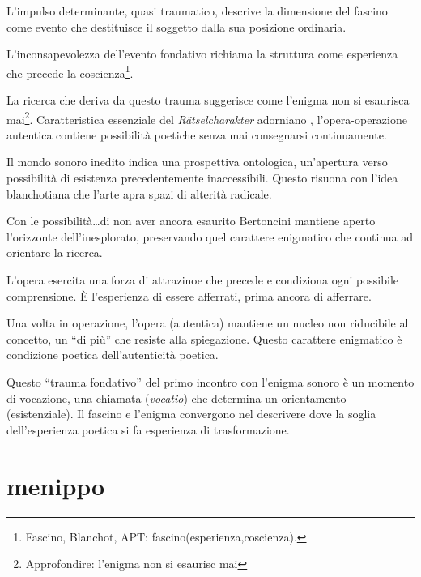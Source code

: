 L'impulso determinante, quasi traumatico, descrive la dimensione del fascino
come evento che destituisce il soggetto dalla sua posizione ordinaria.

L'inconsapevolezza dell'evento fondativo richiama la struttura come esperienza
che precede la coscienza\footnote{Fascino, Blanchot, APT: fascino(esperienza,coscienza).}.

La ricerca che deriva da questo trauma suggerisce come l'enigma non si esaurisca
mai\footnote{Approfondire: l'enigma non si esaurisc mai}. Caratteristica
essenziale del \emph{Rätselcharakter} adorniano \cite{adorno}, l'opera-operazione
autentica contiene possibilità poetiche senza mai consegnarsi continuamente.

Il mondo sonoro  inedito indica una prospettiva ontologica, un'apertura verso
possibilità di esistenza precedentemente inaccessibili. Questo risuona con
l'idea blanchotiana che l'arte apra spazi di alterità radicale.

Con le possibilità\ldots di non aver ancora esaurito Bertoncini mantiene aperto
l'orizzonte dell'inesplorato, preservando quel carattere enigmatico che continua
ad orientare la ricerca.

L'opera esercita una forza di attrazinoe che precede e condiziona ogni possibile
comprensione. È l'esperienza di essere afferrati, prima ancora di afferrare.

Una volta in operazione, l'opera (autentica) mantiene un nucleo non riducibile
al concetto, un “di più” che resiste alla spiegazione. Questo carattere
enigmatico è condizione poetica dell'autenticità poetica.

Questo “trauma fondativo” del primo incontro con l'enigma sonoro è un momento di
vocazione, una chiamata (\emph{vocatio}) che determina un orientamento
(esistenziale). Il fascino \cite{blanchot82} e l'enigma \cite{adorno} convergono
nel descrivere dove la soglia dell'esperienza poetica si fa esperienza di
trasformazione.

\section*{menippo}


